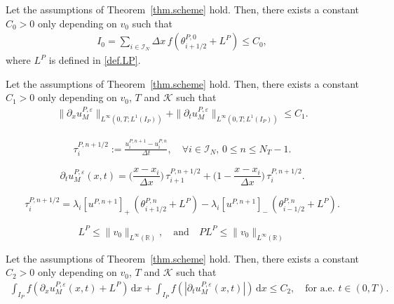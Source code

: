 \documentclass[10pt,a4paper]{amsart}
\newcommand{\I}{\mathcal{I}_N}
\newcommand{\K}{\mathcal{K}}
\newcommand{\R}{\mathbb{R}}
\newcommand{\dd}{\mathrm{d}}
\newcommand{\eps}{\varepsilon}
\newcommand{\pa}{\partial}
\begin{document}
\begin{lemma}\label{lem.boundinitent}
Let the assumptions of Theorem~\ref{thm.scheme} hold. Then, there exists a constant $C_0>0$ 
only depending on $v_0$ 
 such that
\begin{align*}
    I_0=\sum_{i\in\I} \Delta x \, f\left(\theta^{P,0}_{i+1/2}+L^P\right) \leq C_0, 
\end{align*}
where $L^P$ is defined in \eqref{def.LP}. 

\end{lemma}

\begin{lemma}\label{lem.LinftyL1estime}
Let the assumptions of Theorem~\ref{thm.scheme} hold. Then, there exists a constant $C_1>0$ only depending on $v_0$, $T$ and $\K$ such that
\begin{align}\label{LinftyL1.paxu.patu}
    \|\pa_x u^{P,\eps}_M\|_{L^\infty(0,T;L^1(I_P))} + \|\pa_t u^{P,\eps}_M\|_{L^\infty(0,T;L^1(I_P))} \leq C_1.
\end{align}
\end{lemma}

\begin{align}\label{def.tau}
\tau_i^{P, n +1/2} := \frac{u_i^{P, n + 1} - u_i^{P, n}}{\Delta t}, \quad \forall i \in \I, \, 0\leq n \leq N_T-1. 
\end{align}

\begin{equation}\label{decompo.patuPeps}
\partial_t u^{P, \eps}_M(x,t) = \bigg(\frac{x - x_i}{\Delta x}\bigg) \, \tau_{i + 1}^{P, n +1/2}+\bigg( 1 - \frac{x - x_i}{\Delta x}\bigg)\, \tau_i^{P, n +1/2}. 
\end{equation}

\begin{equation}\label{tau in theta}
\tau_i^{P, n +1/2} = \lambda_i[u^{P, n + 1}]_+ \, \left(\theta_{i +1/2}^{P,n} + L^P\right) - \lambda_i[u^{P,n + 1}]_- \, \left(\theta_{i-1/2}^{P, n} + L^P\right).
\end{equation}

\begin{equation}\label{estimationLPPLP}L^P  \leq \|v_0\|_{L^\infty(\R)},  
\quad \mbox{and}\quad PL^P  \leq \|v_0\|_{L^\infty(\R)} \end{equation}

\begin{lemma}\label{lem.fpartial}
Let the assumptions of Theorem~\ref{thm.scheme} hold. Then, there exists a constant $C_2>0$ only depending on  $v_0$, $T$ and $\K$ such that
\begin{align}
    \int_{I_P} f\left(\pa_x u^{P,\eps}_M(x,t)+L^P \right) \, \dd x + \int_{I_P} f\left(\left|\pa_t u^{P,\eps}_M(x,t)\right| \right) \, \dd x \leq C_2, \quad \mbox{for a.e. }t\in(0,T).
\end{align}
\end{lemma}
\end{document}

